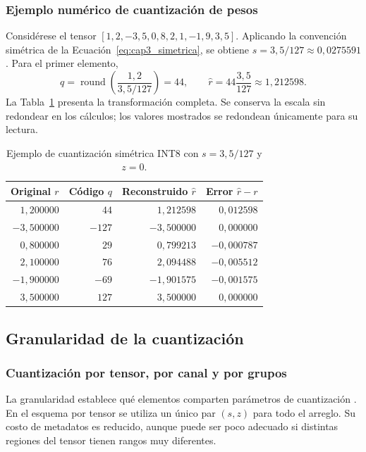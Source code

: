 \subsubsection{Ejemplo numérico de cuantización de pesos}
Considérese el tensor $[1{,}2,-3{,}5,0{,}8,2{,}1,-1{,}9,3{,}5]$. Aplicando la convención simétrica de la Ecuación~\ref{eq:cap3_simetrica}, se obtiene $s=3{,}5/127\approx0{,}0275591$. Para el primer elemento,
\begin{equation}
q=\operatorname{round}\left(\frac{1{,}2}{3{,}5/127}\right)=44,
\qquad \widehat r=44\frac{3{,}5}{127}\approx1{,}212598.
\end{equation}
La Tabla~\ref{tab:cap3_ejemplo} presenta la transformación completa. Se conserva la escala sin redondear en los cálculos; los valores mostrados se redondean únicamente para su lectura.

\begin{table}[htbp]\centering\small
\caption{Ejemplo de cuantización simétrica INT8 con $s=3{,}5/127$ y $z=0$.}\label{tab:cap3_ejemplo}
\begin{tabular}{rrrr}\toprule
Original $r$ & Código $q$ & Reconstruido $\widehat r$ & Error $\widehat r-r$\\\midrule
$1{,}200000$ & $44$ & $1{,}212598$ & $0{,}012598$\\
$-3{,}500000$ & $-127$ & $-3{,}500000$ & $0{,}000000$\\
$0{,}800000$ & $29$ & $0{,}799213$ & $-0{,}000787$\\
$2{,}100000$ & $76$ & $2{,}094488$ & $-0{,}005512$\\
$-1{,}900000$ & $-69$ & $-1{,}901575$ & $-0{,}001575$\\
$3{,}500000$ & $127$ & $3{,}500000$ & $0{,}000000$\\\bottomrule
\end{tabular}
\end{table}

\subsection{Granularidad de la cuantización}
\subsubsection{Cuantización por tensor, por canal y por grupos}
La granularidad establece qué elementos comparten parámetros de cuantización \cite{krishnamoorthi2018}. En el esquema por tensor se utiliza un único par $(s,z)$ para todo el arreglo. Su costo de metadatos es reducido, aunque puede ser poco adecuado si distintas regiones del tensor tienen rangos muy diferentes.

